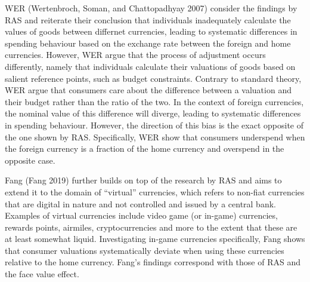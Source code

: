 \documentclass[
]{report}
\begin{document}
WER (Wertenbroch, Soman, and Chattopadhyay 2007) consider the findings
by RAS and reiterate their conclusion that individuals inadequately
calculate the values of goods between differnet currencies, leading to
systematic differences in spending behaviour based on the exchange rate
between the foreign and home currencies. However, WER argue that the
process of adjustment occurs differently, namely that individuals
calculate their valuations of goods based on salient reference points,
such as budget constraints. Contrary to standard theory, WER argue that
consumers care about the difference between a valuation and their budget
rather than the ratio of the two. In the context of foreign currencies,
the nominal value of this difference will diverge, leading to systematic
differences in spending behaviour. However, the direction of this bias
is the exact opposite of the one shown by RAS. Specifically, WER show
that consumers underspend when the foreign currency is a fraction of the
home currency and overspend in the opposite case.

Fang (Fang 2019) further builds on top of the research by RAS and aims
to extend it to the domain of ``virtual'' currencies, which refers to
non-fiat currencies that are digital in nature and not controlled and
issued by a central bank. Examples of virtual currencies include video
game (or in-game) currencies, rewards points, airmiles, cryptocurrencies
and more to the extent that these are at least somewhat liquid.
Investigating in-game currencies specifically, Fang shows that consumer
valuations systematically deviate when using these currencies relative
to the home currency. Fang's findings correspond with those of RAS and
the face value effect.
\end{document}
